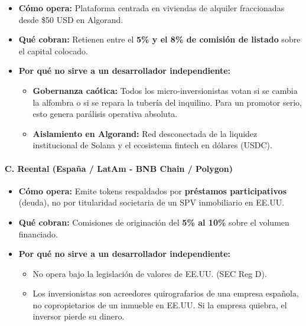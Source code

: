 \documentclass[
]{article}
\providecommand{\tightlist}{%
  \setlength{\itemsep}{0pt}\setlength{\parskip}{0pt}}
\begin{document}
\begin{itemize}
\tightlist
\item
  \textbf{Cómo opera:} Plataforma centrada en viviendas de alquiler
  fraccionadas desde \$50 USD en Algorand.
\item
  \textbf{Qué cobran:} Retienen entre el \textbf{5\% y el 8\% de
  comisión de listado} sobre el capital colocado.
\item
  \textbf{Por qué no sirve a un desarrollador independiente:}

  \begin{itemize}
  \tightlist
  \item
    \textbf{Gobernanza caótica:} Todos los micro-inversionistas votan si
    se cambia la alfombra o si se repara la tubería del inquilino. Para
    un promotor serio, esto genera parálisis operativa absoluta.
  \item
    \textbf{Aislamiento en Algorand:} Red desconectada de la liquidez
    institucional de Solana y el ecosistema fintech en dólares (USDC).
  \end{itemize}
\end{itemize}

\paragraph{C. Reental (España / LatAm - BNB Chain /
Polygon)}\label{c.-reental-espauxf1a-latam---bnb-chain-polygon}

\begin{itemize}
\tightlist
\item
  \textbf{Cómo opera:} Emite tokens respaldados por \textbf{préstamos
  participativos} (deuda), no por titularidad societaria de un SPV
  inmobiliario en EE.UU.
\item
  \textbf{Qué cobran:} Comisiones de originación del \textbf{5\% al
  10\%} sobre el volumen financiado.
\item
  \textbf{Por qué no sirve a un desarrollador independiente:}

  \begin{itemize}
  \tightlist
  \item
    No opera bajo la legislación de valores de EE.UU. (SEC Reg D).
  \item
    Los inversionistas son acreedores quirografarios de una empresa
    española, no copropietarios de un inmueble en EE.UU. Si la empresa
    quiebra, el inversor pierde su dinero.
  \end{itemize}
\end{itemize}
\end{document}
